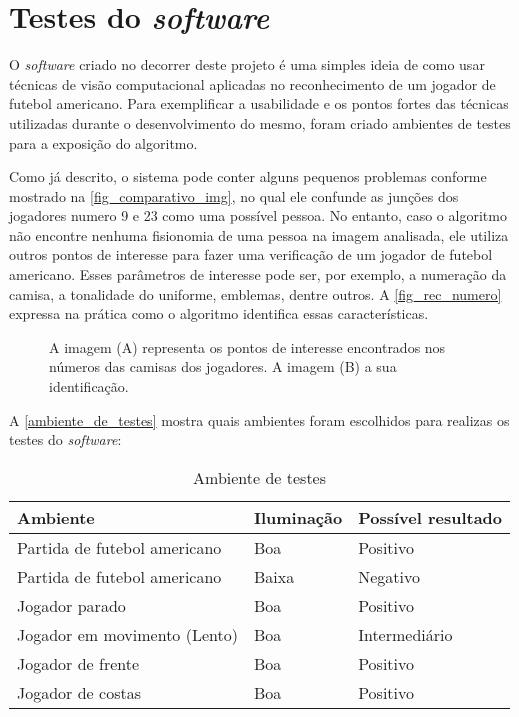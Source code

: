 \section{\textbf{Testes do \textit{software}}}
\label{ambientes-de-teste}
O \textit{software} criado no decorrer deste projeto é uma simples ideia de como usar técnicas de visão computacional aplicadas no reconhecimento de um jogador de futebol americano. Para exemplificar a usabilidade e os pontos fortes das técnicas utilizadas durante o desenvolvimento do mesmo, foram criado ambientes de testes para a exposição do algoritmo.

Como já descrito, o sistema pode conter alguns pequenos problemas conforme mostrado na \autoref{fig_comparativo_img}, no qual ele confunde as junções dos jogadores numero 9 e 23 como uma possível pessoa. No entanto, caso o algoritmo não encontre nenhuma fisionomia de uma pessoa na imagem analisada, ele utiliza outros pontos de interesse para fazer uma verificação de um jogador de futebol americano. Esses parâmetros de interesse pode ser, por exemplo, a numeração da camisa, a tonalidade do uniforme, emblemas, dentre outros. A \autoref{fig_rec_numero} expressa na prática como o algoritmo identifica essas características.

\begin{figure}[h]
	\caption{\label{fig_rec_numero}A imagem (A) representa os pontos de interesse encontrados nos números das camisas dos jogadores. A imagem (B) a sua identificação.}
	\begin{center}
	\end{center}
	\centering {}
\end{figure}

A \autoref{ambiente_de_testes} mostra quais ambientes foram escolhidos para realizas os testes do \textit{software}:

\begin{table}[h]
\centering
\caption{Ambiente de testes}
\label{ambiente_de_testes}
\begin{tabular}{l|l|l} 
\hline
\hline
\multicolumn{1}{l|}{Ambiente} & Iluminação & \multicolumn{1}{l}{Possível resultado}  \\ 
\hline
Partida de futebol americano   & Boa        & Positivo                                 \\
Partida de futebol americano   & Baixa      & Negativo                                 \\
Jogador parado                 & Boa        & Positivo                                 \\
Jogador em movimento (Lento)   & Boa        & Intermediário                            \\
Jogador de frente              & Boa        & Positivo                                 \\
Jogador de costas              & Boa        & Positivo \\
\hline
\hline 
\end{tabular}
\end{table}